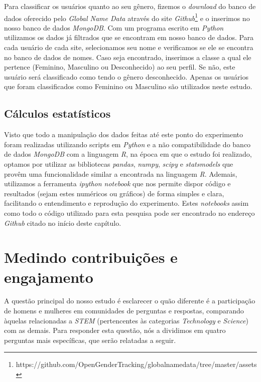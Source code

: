 Para classificar os usuários quanto ao seu gênero, fizemos o \emph{download} do banco de dados oferecido pelo \emph{Global Name Data} através do site \emph{Github}\footnote{https://github.com/OpenGenderTracking/globalnamedata/tree/master/assets} e o inserimos no nosso banco de dados \emph{MongoDB}. Com um programa escrito em \emph{Python} utilizamos os dados já filtrados que se encontram em nosso banco de dados. Para cada usuário de cada site, selecionamos seu nome e verificamos se ele se encontra no banco de dados de nomes. Caso seja encontrado, inserimos a classe a qual ele pertence (Feminino, Masculino ou Desconhecido) ao seu perfil. Se não, este usuário será classificado como tendo o gênero desconhecido. Apenas os usuários que foram classificados como Feminino ou Masculino são utilizados neste estudo.

\subsection{Cálculos estatísticos}

Visto que todo a manipulação dos dados feitas até este ponto do experimento foram realizadas utilizando scripts em \emph{Python} e a não compatibilidade do banco de dados \emph{MongoDB} com a linguagem \emph{R}, na época em que o estudo foi realizado, optamos por utilizar as bibliotecas \emph{pandas}, \emph{numpy}, \emph{scipy} e \emph{statsmodels} que provêm uma funcionalidade similar a encontrada na linguagem \emph{R}. Ademais, utilizamos a ferramenta \emph{ipython notebook} que nos permite dispor código e resultados (sejam estes numéricos ou gráficos) de forma simples e clara, facilitando o entendimento e reprodução do experimento. Estes \emph{notebooks} assim como todo o código utilizado para esta pesquisa pode ser encontrado no endereço \emph{Github} citado no início deste capítulo.

\section{Medindo contribuições e engajamento}

A questão principal do nosso estudo é esclarecer o quão diferente é a participação de homens e mulheres em comunidades de perguntas e respostas, comparando àquelas relacionadas a \emph{STEM} (pertencentes às categorias \emph{Technology} e \emph{Science}) com as demais. Para responder esta questão, nós a dividimos em quatro perguntas mais específicas, que serão relatadas a seguir.

